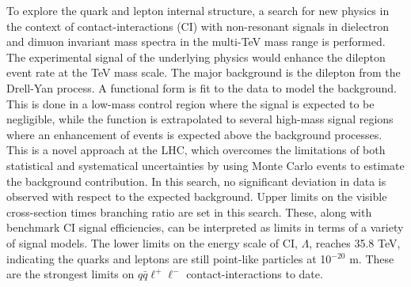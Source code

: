 To explore the quark and lepton internal structure, a search for new physics in the context of contact-interactions (CI) with non-resonant signals in dielectron and dimuon invariant mass spectra in the multi-TeV mass range is performed.
The experimental signal of the underlying physics would enhance the dilepton event rate at the TeV mass scale.
The major background is the dilepton from the Drell-Yan process.
A functional form is fit to the data to model the background.
This is done in a low-mass control region where the signal is expected to be negligible, while the function is extrapolated to several high-mass signal regions where an enhancement of events is expected above the background processes.
This is a novel approach at the LHC, which overcomes the limitations of both statistical and systematical uncertainties by using Monte Carlo events to estimate the background contribution.
In this search, no significant deviation in data is observed with respect to the expected background.
Upper limits on the visible cross-section times branching ratio are set in this search.
These, along with benchmark CI signal efficiencies, can be interpreted as limits in terms of a variety of signal models.
The lower limits on the energy scale of CI, $\Lambda$, reaches 35.8 TeV, indicating the quarks and leptons are still point-like particles at 10$^{-20}$ m.
These are the strongest limits on $q\bar{q}\ell^+\ell^-$ contact-interactions to date.

